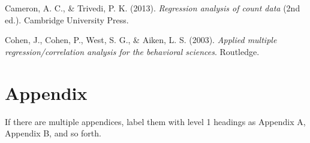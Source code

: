 \documentclass[
  floatsintext,
  man,
  colorlinks=true,linkcolor=blue,citecolor=blue,urlcolor=blue,biblatex]{apa7}
\newlength{\cslhangindent}
\newlength{\cslentryspacingunit} %
\newenvironment{CSLReferences}[2] %
 {%
  \setlength{\parindent}{0pt}
  \ifodd #1
  \let\oldpar\par
  \def\par{\hangindent=\cslhangindent\oldpar}
  \fi
  \setlength{\parskip}{#2\cslentryspacingunit}
 }%
 {}
\begin{document}
\hypertarget{refs}{}
\begin{CSLReferences}{1}{0}
\leavevmode{}%
Cameron, A. C., \& Trivedi, P. K. (2013). \emph{Regression analysis of
count data} (2nd ed.). Cambridge University Press.

\leavevmode{}%
Cohen, J., Cohen, P., West, S. G., \& Aiken, L. S. (2003). \emph{Applied
multiple regression/correlation analysis for the behavioral sciences}.
Routledge.

\end{CSLReferences}

\newpage{}

\hypertarget{appendix}{%
\section{Appendix}\label{appendix}}

If there are multiple appendices, label them with level 1 headings as
Appendix A, Appendix B, and so forth.
\end{document}
